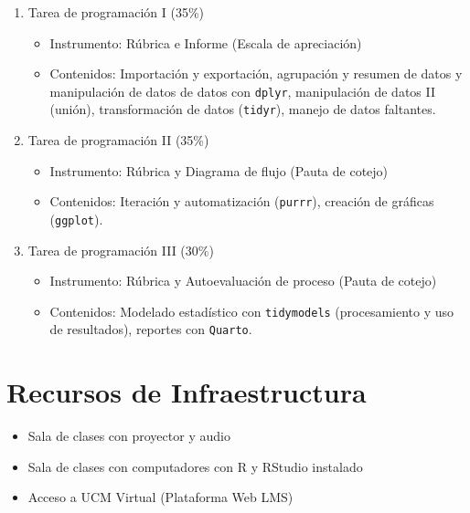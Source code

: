 \documentclass[11pt,letter,]{article}
\providecommand{\tightlist}{%
  \setlength{\itemsep}{0pt}\setlength{\parskip}{0pt}}
\begin{document}
\begin{enumerate}
\def\labelenumi{\arabic{enumi}.}
\tightlist
\item
  Tarea de programación I (35\%)

  \begin{itemize}
  \tightlist
  \item
    Instrumento: Rúbrica e Informe (Escala de apreciación)
  \item
    Contenidos: Importación y exportación, agrupación y resumen de datos
    y manipulación de datos de datos con \texttt{dplyr}, manipulación de
    datos II (unión), transformación de datos (\texttt{tidyr}), manejo
    de datos faltantes.
  \end{itemize}
\item
  Tarea de programación II (35\%)

  \begin{itemize}
  \tightlist
  \item
    Instrumento: Rúbrica y Diagrama de flujo (Pauta de cotejo)
  \item
    Contenidos: Iteración y automatización (\texttt{purrr}), creación de
    gráficas (\texttt{ggplot}).
  \end{itemize}
\item
  Tarea de programación III (30\%)

  \begin{itemize}
  \tightlist
  \item
    Instrumento: Rúbrica y Autoevaluación de proceso (Pauta de cotejo)
  \item
    Contenidos: Modelado estadístico con \texttt{tidymodels}
    (procesamiento y uso de resultados), reportes con \texttt{Quarto}.
  \end{itemize}
\end{enumerate}

\hypertarget{recursos-de-infraestructura}{%
\section{Recursos de
Infraestructura}\label{recursos-de-infraestructura}}

\begin{itemize}
\tightlist
\item
  Sala de clases con proyector y audio
\item
  Sala de clases con computadores con R y RStudio instalado
\item
  Acceso a UCM Virtual (Plataforma Web LMS)
\end{itemize}
\end{document}
